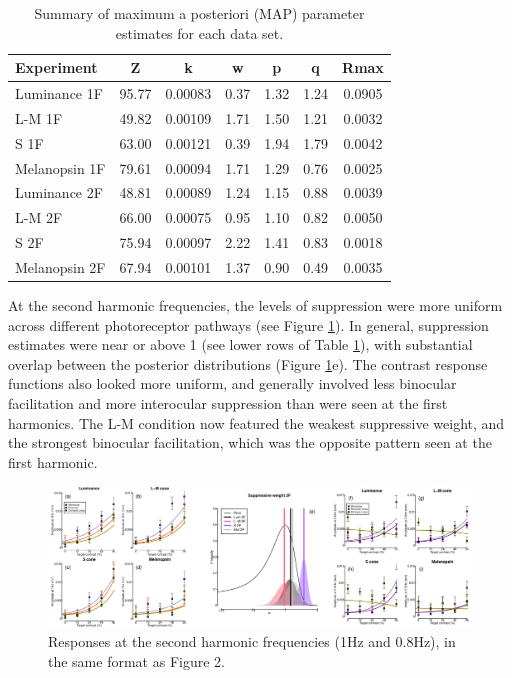 \documentclass[
]{article}
\begin{document}
\begin{table}[H]

\caption{\label{tab:paramtable}Summary of maximum a posteriori (MAP) parameter estimates for each data set.}
\centering
\begin{tabular}[t]{lcccccc}
\toprule
Experiment & Z & k & w & p & q & Rmax\\
\midrule
Luminance 1F & 95.77 & 0.00083 & 0.37 & 1.32 & 1.24 & 0.0905\\
L-M 1F & 49.82 & 0.00109 & 1.71 & 1.50 & 1.21 & 0.0032\\
S 1F & 63.00 & 0.00121 & 0.39 & 1.94 & 1.79 & 0.0042\\
Melanopsin 1F & 79.61 & 0.00094 & 1.71 & 1.29 & 0.76 & 0.0025\\
\midrule
Luminance 2F & 48.81 & 0.00089 & 1.24 & 1.15 & 0.88 & 0.0039\\
L-M 2F & 66.00 & 0.00075 & 0.95 & 1.10 & 0.82 & 0.0050\\
S 2F & 75.94 & 0.00097 & 2.22 & 1.41 & 0.83 & 0.0018\\
Melanopsin 2F & 67.94 & 0.00101 & 1.37 & 0.90 & 0.49 & 0.0035\\
\bottomrule
\end{tabular}
\end{table}

At the second harmonic frequencies, the levels of suppression were more uniform across different photoreceptor pathways (see Figure \ref{fig:SecondHarmonicPlots}). In general, suppression estimates were near or above 1 (see lower rows of Table \ref{tab:paramtable}), with substantial overlap between the posterior distributions (Figure \ref{fig:SecondHarmonicPlots}e). The contrast response functions also looked more uniform, and generally involved less binocular facilitation and more interocular suppression than were seen at the first harmonics. The L-M condition now featured the weakest suppressive weight, and the strongest binocular facilitation, which was the opposite pattern seen at the first harmonic.

\begin{figure}

{\centering \includegraphics{Figures/SecondHarmonic} 

}

\caption{Responses at the second harmonic frequencies (1Hz and 0.8Hz), in the same format as Figure 2.}\label{fig:SecondHarmonicPlots}
\end{figure}
\end{document}
